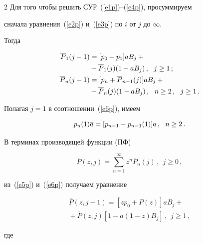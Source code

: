 \begin{multicols}{2}
Для того чтобы решить СУР~(\ref{e1p})--(\ref{e4p}), просуммируем


сначала уравнения~(\ref{e2p}) и~(\ref{e3p}) по $i$ от $j$ до $\infty$.


Тогда


\begin{align}


\overline P_1(j-1) &= [p_0 + p_1]aB_j +{}\notag\\


&{}+ \overline P_{1}(j) (1-a B_{j})\,,


\ \ j\ge 1\,; \label{e5p}\\


\overline P_n(j-1) & = [p_n + \overline P_{n-1}(j)] a B_j +{}\notag\\


&{}+


\overline P_{n}(j) (1-a B_{j})\,,  \ \ n\ge 2\,,\ \ j\ge 1\,.   \label{e6p}


\end{align}


Полагая $j=1$ в соотношении~(\ref{e6p}), имеем


\begin{equation}


p_n(1) \a = [p_{n-1} - p_{n-1}(1)] a\,, \ \ n\ge 2\,.    


\label{e7p}


\end{equation}





В терминах производящей функции (ПФ)


$$


\overline P(z,j) = \sum_{n=1}^\infty z^n \overline P_{n}(j)\,,


\ \ j\ge 0\,,


$$


из~(\ref{e5p}) и~(\ref{e6p}) получаем уравнение


\begin{multline}


\overline P(z,j-1) = [z p_0 + P(z)] a B_j +\\


{}+


\overline P(z,j) [1-a(1-z) B_{j}]\,,


\ \ j\ge 1\,,  \label{e8p}


\end{multline}


где



\end{multicols}
